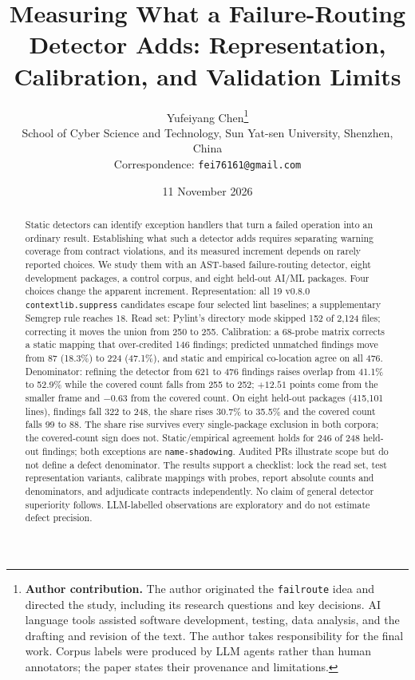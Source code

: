 \documentclass[10pt,a4paper]{article}
\title{Measuring What a Failure-Routing Detector Adds: Representation, Calibration, and Validation Limits}
\author{Yufeiyang Chen\thanks{%
  \textbf{Author contribution.} The author originated the \texttt{failroute}
  idea and directed the study, including its research questions and key decisions.
  AI language tools assisted software development, testing, data analysis, and
  the drafting and revision of the text. The author takes responsibility for the final work.
  Corpus labels were produced by LLM agents rather than human annotators; the paper states their provenance and limitations.}\\[2pt]
  School of Cyber Science and Technology, Sun Yat-sen University, Shenzhen, China\\
  Correspondence: \texttt{fei76161@gmail.com}}
\date{11 November 2026}
\begin{document}
\maketitle

\begin{abstract}
Static detectors can identify exception handlers that turn a failed
operation into an ordinary result. Establishing what such a detector adds
requires separating warning coverage from contract violations, and its
measured increment depends on rarely reported choices. We study them with
an AST-based failure-routing detector, eight development packages, a
control corpus, and eight held-out AI/ML packages. Four choices change
the apparent increment. Representation: all 19 v0.8.0
\texttt{contextlib.suppress} candidates escape four selected lint
baselines; a supplementary Semgrep rule reaches 18. Read set: Pylint's
directory mode skipped 152 of 2{,}124 files; correcting it moves the union
from 250 to 255. Calibration: a 68-probe matrix corrects a static mapping
that over-credited 146 findings; predicted unmatched findings move from 87
(18.3\%) to 224 (47.1\%), and static and empirical co-location agree on all
476. Denominator: refining the detector from 621 to 476 findings raises
overlap from 41.1\% to 52.9\% while the covered count falls from 255 to
252; $+12.51$ points come from the smaller frame and $-0.63$ from the
covered count. On eight held-out packages (415{,}101 lines), findings fall
322 to 248, the share rises 30.7\% to 35.5\% and the covered count falls
99 to 88. The share rise survives every single-package exclusion in both
corpora; the covered-count sign does not. Static/empirical agreement holds
for 246 of 248 held-out findings; both exceptions are
\texttt{name-shadowing}. Audited PRs illustrate scope but do not define
a defect denominator. The results support a checklist: lock the read set, test
representation variants, calibrate mappings with probes, report absolute
counts and denominators, and adjudicate contracts independently. No claim
of general detector superiority follows. LLM-labelled observations are
exploratory and do not estimate defect precision.
\end{abstract}
\end{document}
